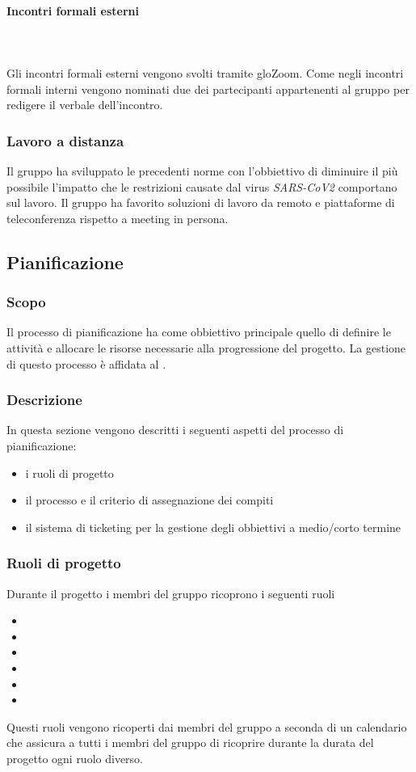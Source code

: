 \paragraph{Incontri formali esterni}\mbox{}\\
\mbox{}\\
Gli incontri formali esterni vengono svolti tramite glo{Zoom}. Come negli incontri formali interni vengono nominati due dei partecipanti appartenenti al gruppo per redigere il verbale dell'incontro. 

\subsubsection{Lavoro a distanza}
Il gruppo ha sviluppato le precedenti norme con l'obbiettivo di diminuire il più possibile l'impatto che le restrizioni causate dal virus \textit{SARS-CoV2} comportano sul lavoro. Il gruppo ha favorito soluzioni di lavoro da remoto e piattaforme di teleconferenza rispetto a meeting in persona.

\subsection{Pianificazione}
\subsubsection{Scopo}
Il processo di pianificazione ha come obbiettivo principale quello di definire le attività e allocare le risorse necessarie alla progressione del progetto. La gestione di questo processo è affidata al \RdP{}.
\subsubsection{Descrizione}
In questa sezione vengono descritti i seguenti aspetti del processo di pianificazione:
\begin{itemize}
\item i ruoli di progetto
\item il processo e il criterio di assegnazione dei compiti
\item il sistema di ticketing per la gestione degli obbiettivi a medio/corto termine
\end{itemize} 
\subsubsection{Ruoli di progetto}
Durante il progetto i membri del gruppo ricoprono i seguenti ruoli
\begin{itemize}
\item \RdP{}
\item \adm{}
\item \ana{}
\item \prog{}
\item \progr{}
\item \ver{}
\end{itemize}
Questi ruoli vengono ricoperti dai membri del gruppo a seconda di un calendario che assicura a tutti i membri del gruppo di ricoprire durante la durata del progetto ogni ruolo diverso.

